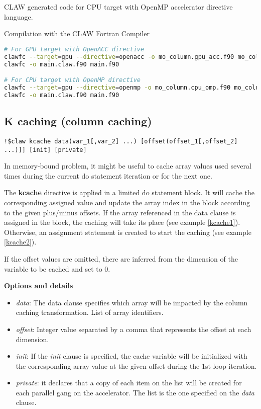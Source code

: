 CLAW generated code for CPU target with OpenMP accelerator directive language.


Compilation with the CLAW Fortran Compiler
\begin{lstlisting}[language=bash]
# For GPU target with OpenACC directive
clawfc --target=gpu --directive=openacc -o mo_column.gpu_acc.f90 mo_column.f90
clawfc -o main.claw.f90 main.f90

# For CPU target with OpenMP directive
clawfc --target=gpu --directive=openmp -o mo_column.cpu_omp.f90 mo_column.f90
clawfc -o main.claw.f90 main.f90
\end{lstlisting}

\subsection{K caching (column caching)}
\begin{lstlisting}
!$claw kcache data(var_1[,var_2] ...) [offset(offset_1[,offset_2] ...)]] [init] [private]
\end{lstlisting}

In memory-bound problem, it might be useful to cache array values used several
times during the current do statement iteration or for the next one.

The \textbf{kcache} directive is applied in a limited do statement block. It
will cache the corresponding assigned value and update the array index in the
block according to the given plus/minus offsets. If the array referenced in the
data clause is assigned in the block, the caching will take its place (see
example \ref{kcache1}). Otherwise, an assignment statement is created to start
the caching (see example \ref{kcache2}).

If the offset values are omitted, there are inferred from the dimension of the
variable to be cached and set to 0.

\textbf{Options and details}
\begin{itemize}
\item \textit{data}: The data clause specifies which array will be impacted by
the column caching transformation. List of array identifiers.
\item \textit{offset}: Integer value separated by a comma that represents the
offset at each dimension.
\item \textit{init}: If the \textit{init} clause is specified, the cache
variable will be initialized with the corresponding array value at the given
offset during the 1st loop iteration.
\item \textit{private}: it declares that a copy of each item on the list will
be created for each parallel gang on the accelerator. The list is the one
specified on the \textit{data} clause.
\end{itemize}


